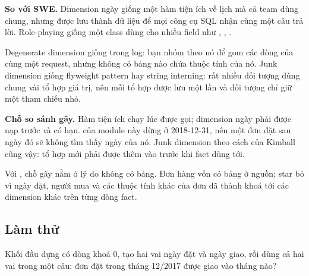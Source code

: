 \begin{ghichu}
\textbf{So với SWE.} Dimension ngày giống một hàm tiện ích về lịch mà cả team dùng chung, nhưng được lưu thành dữ liệu để mọi công cụ SQL nhận cùng một câu trả lời. Role-playing giống một class  dùng cho nhiều field như , , .

Degenerate dimension giống  trong log: bạn nhóm theo nó để gom các dòng của cùng một request, nhưng không có bảng  nào chứa thuộc tính của nó. Junk dimension giống flyweight pattern hay string interning: rất nhiều đối tượng dùng chung vài tổ hợp giá trị, nên mỗi tổ hợp được lưu một lần và đối tượng chỉ giữ một tham chiếu nhỏ.

\textbf{Chỗ so sánh gãy.} Hàm tiện ích chạy lúc được gọi; dimension ngày phải được nạp trước và có hạn.  của module này dừng ở 2018-12-31, nên một đơn đặt sau ngày đó sẽ không tìm thấy ngày của nó. Junk dimension theo cách của Kimball cũng vậy: tổ hợp mới phải được thêm vào trước khi fact dùng tới.

Với , chỗ gãy nằm ở lý do không có bảng. Đơn hàng vốn có bảng  ở nguồn; star bỏ  vì ngày đặt, người mua và các thuộc tính khác của đơn đã thành khoá tới các dimension khác trên từng dòng fact.
\end{ghichu}

\subsection{Làm thử}

Khối đầu dựng  có dòng khoá 0, tạo hai vai ngày đặt và ngày giao, rồi dùng cả hai vai trong một câu: đơn đặt trong tháng 12/2017 được giao vào tháng nào?

